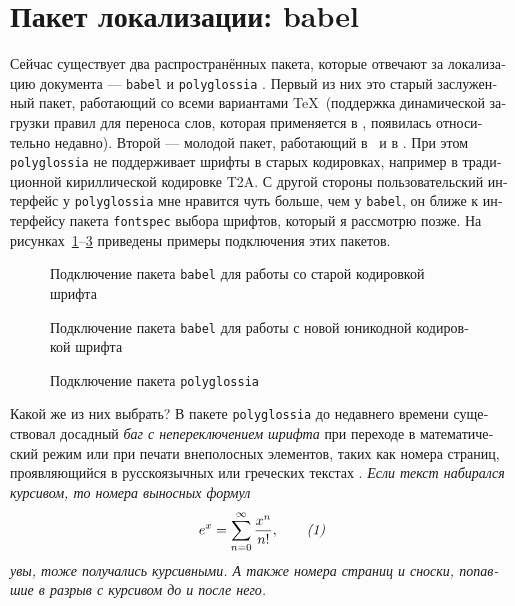 \documentclass[a4paper,12pt,hyphens]{article}
\newcommand\package[1]{\texttt{#1}}
\begin{document}
\section{Пакет локализации: babel}
Сейчас существует два распространённых пакета, которые отвечают за
локализацию документа ---
\package{babel} \parencite{ctan-babel} и
\package{polyglossia} \parencite{ctan-polyglossia}.
Первый из них это старый заслуженный пакет, работающий со всеми
вариантами \TeX\ (поддержка динамической загрузки правил для
переноса слов, которая применяется в \LuaTeX, появилась относительно
недавно). Второй --- молодой пакет, работающий в \XeLaTeX\ и в \LuaLaTeX.
При этом \package{polyglossia} не поддерживает шрифты в старых кодировках,
например в традиционной кириллической кодировке T2A. С другой стороны
пользовательский интерфейс у \package{polyglossia} мне нравится чуть больше,
чем у \package{babel}, он ближе к интерфейсу пакета \package{fontspec}
выбора шрифтов, который я рассмотрю позже. На рисунках~\ref{babel1}--\ref{polygl1}
приведены примеры подключения этих пакетов.
\begin{figure}[tp]
\begin{latexcode}
\usepackage[T2A]{fontenc}
\usepackage[utf8]{luainputenc}
\usepackage[english,russian]{babel}
\end{latexcode}
\caption{Подключение пакета \package{babel} для работы со старой кодировкой шрифта}\label{babel1}
\end{figure}
\begin{figure}[tp]
\begin{latexcode}
\usepackage[english,russian]{babel}
\end{latexcode}
\caption{Подключение пакета \package{babel} для работы с новой юникодной кодировкой шрифта}\label{babel2}
\end{figure}
\begin{figure}[tp]
\begin{latexcode}
\usepackage{polyglossia}
\setmainlanguage{russian}
\end{latexcode}
\caption{Подключение пакета \package{polyglossia}}\label{polygl1}
\end{figure}

Какой же из них выбрать? В пакете \package{polyglossia} до недавнего времени
существовал досадный \emph{баг с непереключением шрифта} при переходе в математический
режим или при печати внеполосных элементов, таких как номера страниц,
проявляющийся в русскоязычных или греческих текстах \parencite{bug-polyglossia-24}.
{\itshape Если текст набирался курсивом, то номера выносных формул
\begin{equation}
e^x=\sum_{n=0}^\infty\frac{x^n}{n!},\tag*{\textit{(1)}}
\end{equation}
увы, тоже получались курсивными. А также номера страниц и сноски, попавшие
в разрыв с курсивом до и после него.}
\end{document}
